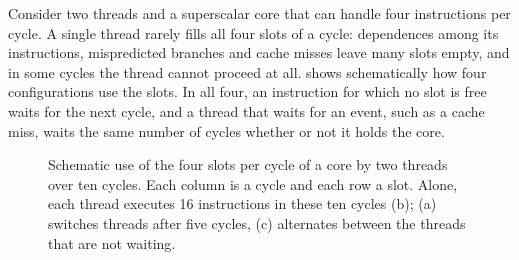 \documentclass[../main.tex]{subfiles}
\begin{document}
Consider two threads and a superscalar core that can handle four
instructions per cycle.  A single thread rarely fills all four
slots of a cycle: dependences among its instructions, mispredicted branches
and cache misses leave many slots empty, and in some cycles the thread
cannot proceed at all.   shows schematically how
four configurations use the slots.  In all four, an instruction for which
no slot is free waits for the next cycle, and a thread that waits for an
event, such as a cache miss, waits the same number of cycles whether or
not it holds the core.

\begin{figure}[htbp]
  \centering
  
  \caption{Schematic use of the four slots per cycle of a core by two
    threads over ten cycles.  Each column is a cycle and each row a slot.
    Alone, each thread executes 16 instructions in these ten cycles (b);
    (a) switches threads after five cycles, (c) alternates between the
    threads that are not waiting.}
  \label{fig:l18-mt-timing}
\end{figure}
\end{document}
